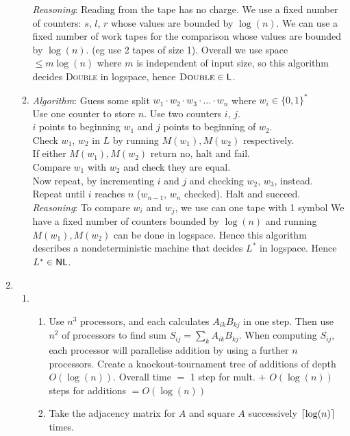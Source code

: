 \documentclass[a4paper, draft, 12pt]{article}
\begin{document}
\begin{enumerate}
\begin{enumerate}
  \textit{Reasoning}:
  Reading from the tape has no charge. We use a fixed number of counters: 
  $s$, $l$, $r$ whose values are bounded by $\log(n)$.
  We can use a fixed number of work tapes for the comparison whose 
  values are bounded by $\log(n)$. (eg use 2 tapes of size 1). Overall 
  we use space $\leqslant m\log(n)$ where $m$ is independent of input size, so this 
  algorithm decides \textsc{Double} in logspace, hence $\textsc{Double} \in \textsf{L}$. 
  \item %
  \textit{Algorithm}:
  Guess some split $w_1 \cdot w_2 \cdot w_3 \cdot ... \cdot w_n$ where $w_i \in \{0,1\}^{*}$ \\
  Use one counter to store $n$. Use two counters $i$, $j$. \\
  $i$ points to beginning $w_1$ and $j$ points to beginning of $w_2$. \\
  Check $w_1$, $w_2$ in $L$ by running $M(w_1), M(w_2)$ respectively.\\
  If either $M(w_1), M(w_2)$ return no, halt and fail. \\
  Compare $w_1$ with $w_2$ and check they are equal. \\
  Now repeat, by incrementing $i$ and $j$ and checking $w_2$, $w_3$, instead. \\
  Repeat until $i$ reaches $n$ ($w_{n-1}$, $w_{n}$ checked).
  Halt and succeed.\\
  \textit{Reasoning}:
  To compare $w_{i}$ and $w_{j}$, we use can one tape with 1 symbol
  We have a fixed number of counters bounded by $\log(n)$ and 
  running $M(w_1), M(w_2)$ can be done in logspace. Hence this algorithm 
  describes a nondeterministic machine that decides $L^{*}$ in logspace. 
  Hence $L^{*} \in \textsf{NL}$.
\end{enumerate}
\item %
\begin{enumerate}
\item %
  \begin{enumerate}
  \item Use $n^3$ processors, and each calculates $A_{ik}B_{kj}$ in one step.
  Then use $n^2$ of processors to find sum $S_{ij} = \sum_{k} A_{ik}B_{kj}$. 
  When computing $S_{ij}$, each processor will parallelise addition 
  by using a further $n$ processors. 
  Create a knockout-tournament tree of additions of depth $O(\log(n))$.
  Overall time $=$ 1 step for mult. $+$ $O(\log(n))$ steps for additions $ = O(\log(n))$
  \item Take the adjacency matrix for $A$ and square $A$ successively $\lceil\log(n)\rceil$ times.

\end{enumerate}
\end{enumerate}
\end{enumerate}
\end{document}
